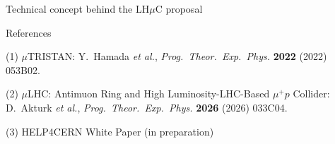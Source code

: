 \documentclass[aspectratio=1610,english]{beamer}
\begin{document}
\begin{frame}{Technical concept behind the LH$\mu$C proposal}
\begin{exampleblock}{References}
\scriptsize
\justifying

(1) \(\mu\)TRISTAN: Y.~Hamada \textit{et al.},
\emph{Prog.\ Theor.\ Exp.\ Phys.} \textbf{2022} (2022) 053B02. 
	
\vspace{0.25em}

(2) \(\mu\)LHC: Antimuon Ring and High Luminosity-LHC-Based \(\mu^+p\) Collider: D.~Akturk \textit{et al.},
\emph{Prog.\ Theor.\ Exp.\ Phys.} \textbf{2026} (2026) 033C04.

\vspace{0.25em}

(3) HELP4CERN White Paper (in preparation)

\end{exampleblock}

	
\end{frame}
\end{document}
